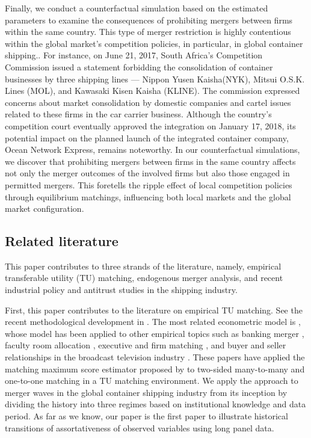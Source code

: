 \documentclass[10pt]{article}
\begin{document}
Finally, we conduct a counterfactual simulation based on the estimated parameters to examine the consequences of prohibiting mergers between firms within the same country.
This type of merger restriction is highly contentious within the global market's competition policies, in particular, in global container shipping..
For instance, on June 21, 2017, South Africa's Competition Commission issued a statement forbidding the consolidation of container businesses by three shipping lines — Nippon Yusen Kaisha(NYK), Mitsui O.S.K. Lines (MOL), and Kawasaki Kisen Kaisha (KLINE). 
The commission expressed concerns about market consolidation by domestic companies and cartel issues related to these firms in the car carrier business.
Although the country's competition court eventually approved the integration on January 17, 2018, its potential impact on the planned launch of the integrated container company, Ocean Network Express, remains noteworthy.
In our counterfactual simulations, we discover that prohibiting mergers between firms in the same country affects not only the merger outcomes of the involved firms but also those engaged in permitted mergers. 
This foretells the ripple effect of local competition policies through equilibrium matchings, influencing both local markets and the global market configuration.

\subsection{Related literature}

This paper contributes to three strands of the literature, namely, empirical transferable utility (TU) matching, endogenous merger analysis, and recent industrial policy and antitrust studies in the shipping industry.

First, this paper contributes to the literature on empirical TU matching. 
See the recent methodological development in \cite{agarwal2021market}.
The most related econometric model is \cite{fox2010qe,fox2018qe}, whose model has been applied to other empirical topics such as banking merger \citep{akkus2015ms,chen2013ijio}, faculty room allocation \citep{baccara2012aer}, executive and firm matching \citep{pan2017determinants}, and buyer and seller relationships in the broadcast television industry \citep{stahl2016aer}. 
These papers have applied the matching maximum score estimator proposed by \cite{fox2010qe,fox2018qe} to two-sided many-to-many and one-to-one matching in a TU matching environment. 
We apply the approach to merger waves in the global container shipping industry from its inception by dividing the history into three regimes based on institutional knowledge and data period.
As far as we know, our paper is the first paper to illustrate historical transitions of assortativeness of observed variables using long panel data.
\end{document}
